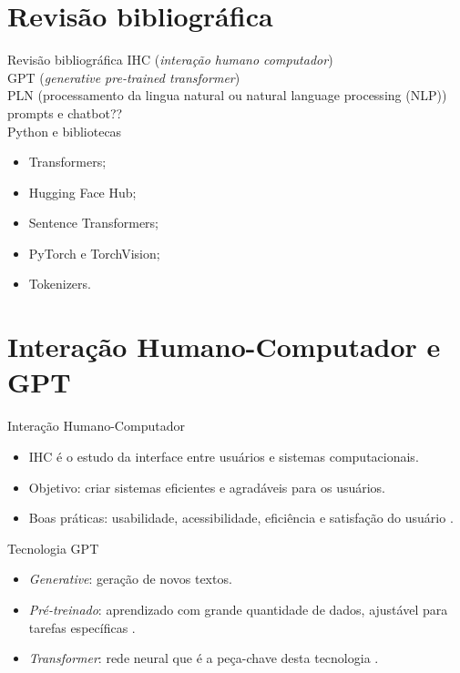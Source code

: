 \documentclass{beamer}
\begin{document}
\section{Revisão bibliográfica}
\begin{frame}[allowframebreaks]{Revisão bibliográfica}
    IHC (\textit{interação humano computador}) \\
    GPT (\textit{generative pre-trained transformer}) \\
    PLN (processamento da lingua natural ou natural language processing (NLP)) \\

    prompts e chatbot??\\

    Python e bibliotecas
    \begin{itemize}
    \item Transformers;
    \item Hugging Face Hub;
    \item Sentence Transformers;
    \item PyTorch e TorchVision;
    \item Tokenizers.    
\end{itemize}
\end{frame}

\section{Interação Humano-Computador e GPT}

\begin{frame}{Interação Humano-Computador}
    \begin{itemize}
        \item IHC é o estudo da interface entre usuários e sistemas computacionais.
        \item Objetivo: criar sistemas eficientes e agradáveis para os usuários.
        \item Boas práticas: usabilidade, acessibilidade, eficiência e satisfação do usuário \cite{Norman13}.
    \end{itemize}
\end{frame}

\begin{frame}{Tecnologia GPT}
    \begin{itemize}
        \item \textit{Generative}: geração de novos textos.
        \item \textit{Pré-treinado}: aprendizado com grande quantidade de dados, ajustável para tarefas específicas \cite{devlin2018bert}.
        \item \textit{Transformer}: rede neural que é a peça-chave desta tecnologia \cite{Attention-Is-All-You-Need}.
    \end{itemize}
\end{frame}
\end{document}
